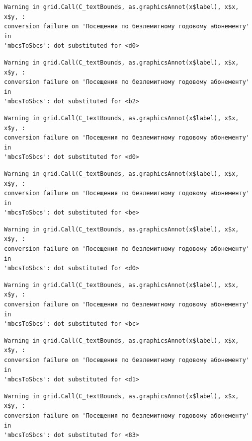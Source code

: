 \documentclass[
  letterpaper,
  DIV=11,
  numbers=noendperiod]{scrartcl}
\begin{document}
\begin{verbatim}
Warning in grid.Call(C_textBounds, as.graphicsAnnot(x$label), x$x, x$y, :
conversion failure on 'Посещения по безлемитному годовому абонементу' in
'mbcsToSbcs': dot substituted for <d0>
\end{verbatim}

\begin{verbatim}
Warning in grid.Call(C_textBounds, as.graphicsAnnot(x$label), x$x, x$y, :
conversion failure on 'Посещения по безлемитному годовому абонементу' in
'mbcsToSbcs': dot substituted for <b2>
\end{verbatim}

\begin{verbatim}
Warning in grid.Call(C_textBounds, as.graphicsAnnot(x$label), x$x, x$y, :
conversion failure on 'Посещения по безлемитному годовому абонементу' in
'mbcsToSbcs': dot substituted for <d0>
\end{verbatim}

\begin{verbatim}
Warning in grid.Call(C_textBounds, as.graphicsAnnot(x$label), x$x, x$y, :
conversion failure on 'Посещения по безлемитному годовому абонементу' in
'mbcsToSbcs': dot substituted for <be>
\end{verbatim}

\begin{verbatim}
Warning in grid.Call(C_textBounds, as.graphicsAnnot(x$label), x$x, x$y, :
conversion failure on 'Посещения по безлемитному годовому абонементу' in
'mbcsToSbcs': dot substituted for <d0>
\end{verbatim}

\begin{verbatim}
Warning in grid.Call(C_textBounds, as.graphicsAnnot(x$label), x$x, x$y, :
conversion failure on 'Посещения по безлемитному годовому абонементу' in
'mbcsToSbcs': dot substituted for <bc>
\end{verbatim}

\begin{verbatim}
Warning in grid.Call(C_textBounds, as.graphicsAnnot(x$label), x$x, x$y, :
conversion failure on 'Посещения по безлемитному годовому абонементу' in
'mbcsToSbcs': dot substituted for <d1>
\end{verbatim}

\begin{verbatim}
Warning in grid.Call(C_textBounds, as.graphicsAnnot(x$label), x$x, x$y, :
conversion failure on 'Посещения по безлемитному годовому абонементу' in
'mbcsToSbcs': dot substituted for <83>
\end{verbatim}
\end{document}
